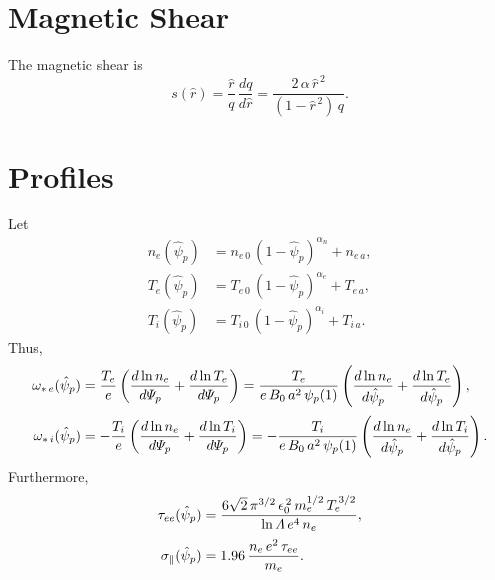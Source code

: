 \documentclass[12pt,prb,aps]{revtex4-1}
\begin{document}
\section{Magnetic Shear}
The magnetic shear is
\begin{equation}
s(\hat{r}) = \frac{\hat{r}}{q}\,\frac{dq}{d\hat{r}} = \frac{2\,\alpha\,\hat{r}^{\,2}}{(1-\hat{r}^{\,2})\,q}.
\end{equation}

\section{Profiles}
Let
\begin{align}
n_e(\hat{\psi}_p) &= n_{e\,0}\,(1-\hat{\psi}_p)^{\alpha_n}+ n_{e\,a},\\[0.5ex]
T_e(\hat{\psi}_p) &= T_{e\,0}\,(1-\hat{\psi}_p)^{\alpha_e}+ T_{e\,a},\\[0.5ex]
T_i(\hat{\psi}_p) &= T_{i\,0}\,(1-\hat{\psi}_p)^{\alpha_i}+ T_{i\,a}.
\end{align}
Thus,
\begin{align}
\omega_{\ast\,e}(\hat{\psi}_p)& = \frac{T_e}{e}\left(\frac{d\ln n_e}{d{\mit\Psi}_p}+ \frac{d\ln T_e}{d{\mit\Psi}_p}\right)=
\frac{T_e}{e\,B_0\,a^2\,\psi_p(1)}\left(\frac{d\ln n_e}{d\hat{\psi}_p}+ \frac{d\ln T_e}{d\hat{\psi}_p}\right),\\[0.5ex]
\omega_{\ast\,i}(\hat{\psi}_p) &= -\frac{T_i}{e}\left(\frac{d\ln n_e}{d{\mit\Psi}_p}+ \frac{d\ln T_i}{d{\mit\Psi}_p}\right)=
-\frac{T_i}{e\,B_0\,a^2\,\psi_p(1)}\left(\frac{d\ln n_e}{d\hat{\psi}_p}+ \frac{d\ln T_i}{d\hat{\psi}_p}\right). 
\end{align}
Furthermore,
\begin{align}
\tau_{ee}(\hat{\psi}_p) &= \frac{6\sqrt{2}\,\pi^{3/2}\,\epsilon_0^{\,2}\,m_e^{1/2}\,T_e^{\,3/2}}{\ln{\mit\Lambda}\,e^4\,n_e},\\[0.5ex]
\sigma_\parallel(\hat{\psi}_p) &= 1.96\,\frac{n_e\,e^2\,\tau_{ee}}{m_e}.
\end{align}
\end{document}
